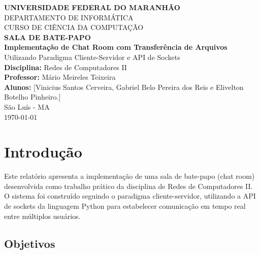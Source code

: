 \documentclass[12pt,a4paper]{article}
\begin{document}
\begin{titlepage}
    \centering
    
    
    {\Large \textbf{UNIVERSIDADE FEDERAL DO MARANHÃO}}\\[0.3cm]
    {\large DEPARTAMENTO DE INFORMÁTICA}\\[0.3cm]
    {\large CURSO DE CIÊNCIA DA COMPUTAÇÃO}\\[1.5cm]
    
    {\huge \textbf{SALA DE BATE-PAPO}}\\[0.3cm]
    {\Large \textbf{Implementação de Chat Room com Transferência de Arquivos}}\\[0.3cm]
    {\large Utilizando Paradigma Cliente-Servidor e API de Sockets}\\[2cm]
    
    {\large \textbf{Disciplina:} Redes de Computadores II}\\[0.3cm]
    {\large \textbf{Professor:} Mário Meireles Teixeira}\\[2cm]
    
    {\large \textbf{Alunos:} [Vinicius Santos Cerveira, Gabriel Belo Pereira dos Reis e Elivelton Botelho Pinheiro.]}\\
    
    {\large São Luís - MA}\\
    {\large \today}
    
\end{titlepage}

\tableofcontents
\newpage

\section{Introdução}

Este relatório apresenta a implementação de uma sala de bate-papo (chat room) desenvolvida como trabalho prático da disciplina de Redes de Computadores II. O sistema foi construído seguindo o paradigma cliente-servidor, utilizando a API de sockets da linguagem Python para estabelecer comunicação em tempo real entre múltiplos usuários.

\subsection{Objetivos}
\end{document}
